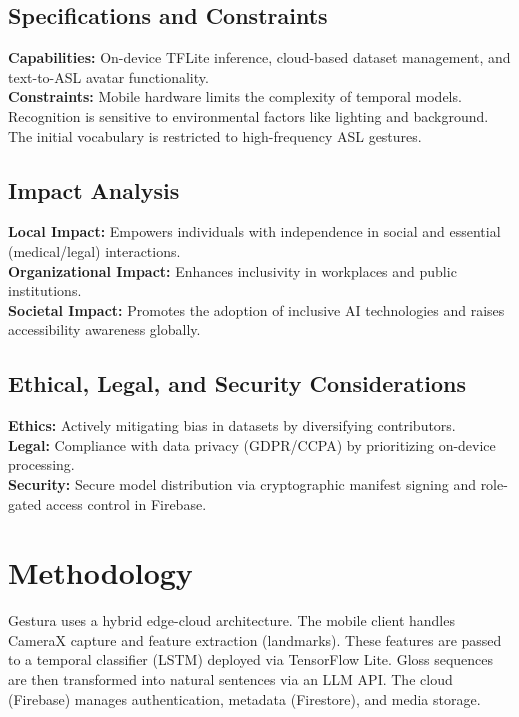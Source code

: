 \documentclass[12pt,a4paper]{article}
\begin{document}
\subsection{Specifications and Constraints}
\textbf{Capabilities:} On-device TFLite inference, cloud-based dataset management, and text-to-ASL avatar functionality. \\
\textbf{Constraints:} Mobile hardware limits the complexity of temporal models. Recognition is sensitive to environmental factors like lighting and background. The initial vocabulary is restricted to high-frequency ASL gestures.

\subsection{Impact Analysis}
\textbf{Local Impact:} Empowers individuals with independence in social and essential (medical/legal) interactions. \\
\textbf{Organizational Impact:} Enhances inclusivity in workplaces and public institutions. \\
\textbf{Societal Impact:} Promotes the adoption of inclusive AI technologies and raises accessibility awareness globally.

\subsection{Ethical, Legal, and Security Considerations}
\textbf{Ethics:} Actively mitigating bias in datasets by diversifying contributors. \\
\textbf{Legal:} Compliance with data privacy (GDPR/CCPA) by prioritizing on-device processing. \\
\textbf{Security:} Secure model distribution via cryptographic manifest signing and role-gated access control in Firebase.

\section{Methodology}
Gestura uses a hybrid edge-cloud architecture. The mobile client handles CameraX capture and feature extraction (landmarks). These features are passed to a temporal classifier (LSTM) deployed via TensorFlow Lite. Gloss sequences are then transformed into natural sentences via an LLM API. The cloud (Firebase) manages authentication, metadata (Firestore), and media storage.

\end{document}
